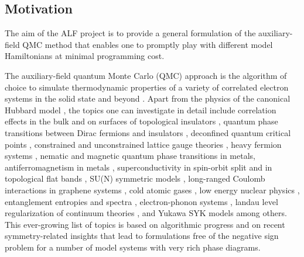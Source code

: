 



\subsection{Motivation}

The aim of the ALF project is to provide a general formulation of the auxiliary-field QMC method that enables one to promptly play with different model Hamiltonians  at  minimal programming cost.

The auxiliary-field quantum Monte Carlo (QMC) approach is the algorithm of choice to simulate  thermodynamic properties of a variety of correlated electron systems in the solid state and beyond \cite{Blankenbecler81,White89,Sugiyama86,Sorella89, Duane87, Assaad08_rev}.  
Apart from the physics of the  canonical Hubbard model 
\cite{Scalapino07,LeBlanc15},   the topics one can investigate in detail include correlation effects in the bulk and on surfaces of topological insulators \cite{Hohenadler10,Zheng11,Hofmann19}, quantum phase transitions between  Dirac fermions  and insulators \cite{Assaad13,Toldin14,Otsuka16,Chandrasekharan13,Chandrasekharan15,Liu18,Li15a,Raczkowski2019},  
deconfined quantum critical points 
\cite{Assaad16,SatoT17,Liu18,Sato20,Wang20},  constrained and unconstrained lattice gauge theories \cite{Assaad16,Gazit16,Gazit18,Xu18,Hohenadler18,Hohenadler19,Gazit19}, heavy fermion systems \cite{Assaad99a,Capponi00,SatoT17_1,Hofmann18,Danu19,Danu20}, nematic \cite{Schattner15,Grossman20} and magnetic  \cite{Xu16c,LiuZH19} quantum phase transitions in metals, antiferromagnetism in metals \cite{Berg12},    superconductivity in spin-orbit split and in topological flat bands \cite{Tang14_1,Hofmann20, Peri20}, SU(N) symmetric models \cite{Assaad04,Lang13,Kim_F17,WangD14,Kim_F18,Raczkowski20},  long-ranged Coulomb interactions in graphene systems \cite{Hohenadler14,Tang15,Tang17,Raczkowski17,Leaw19},  cold atomic gases  \cite{Rigol03},   low energy nuclear physics \cite{Lee09},  entanglement entropies and spectra \cite{Grover13,Broecker14,Assaad13a,Assaad15,Toldin18,Toldin18_1},  electron-phonon systems \cite{Chen18,Chen19,Bradley20},  landau level  regularization of continuum theories \cite{Ippoliti18,WangZ20},    and  Yukawa SYK models \cite{Pan20}   among others. 
This ever-growing list of topics is based on algorithmic progress and on recent symmetry-related insights  \cite{Wu04,Huffman14,Yao14a,Wei16} that lead to formulations free of the negative sign problem for a number of model systems with very rich phase diagrams.



